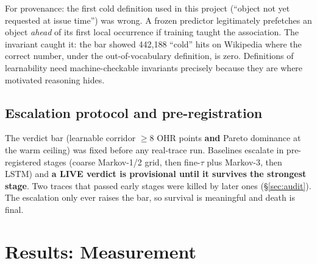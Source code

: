 \documentclass[11pt]{article}
\begin{document}
For provenance: the first cold definition used in this project (``object not yet requested at issue time'') was wrong. A frozen predictor legitimately prefetches an object \emph{ahead} of its first local occurrence if training taught the association. The invariant caught it: the bar showed 442{,}188 ``cold'' hits on Wikipedia where the correct number, under the out-of-vocabulary definition, is zero. Definitions of learnability need machine-checkable invariants precisely because they are where motivated reasoning hides.

\subsection{Escalation protocol and pre-registration}
The verdict bar (learnable corridor $\geq 8$ OHR points \textbf{and} Pareto dominance at the warm ceiling) was fixed before any real-trace run. Baselines escalate in pre-registered stages (coarse Markov-1/2 grid, then fine-$\tau$ plus Markov-3, then LSTM) and \textbf{a LIVE verdict is provisional until it survives the strongest stage}. Two traces that passed early stages were killed by later ones (\S\ref{sec:audit}). The escalation only ever raises the bar, so survival is meaningful and death is final.

\section{Results: Measurement}\label{sec:results}
\end{document}
